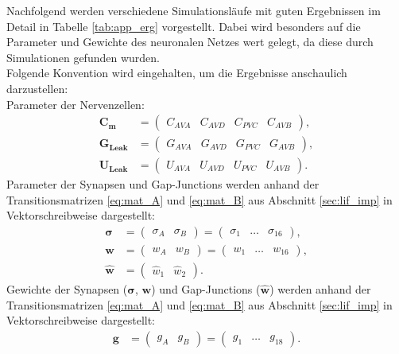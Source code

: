 	Nachfolgend werden verschiedene Simulationsläufe mit guten Ergebnissen im Detail in Tabelle \ref{tab:app_erg} vorgestellt. Dabei wird besonders auf die Parameter und Gewichte des neuronalen Netzes wert gelegt, da diese durch Simulationen gefunden wurden.\\
	Folgende Konvention wird eingehalten, um die Ergebnisse anschaulich darzustellen:\\
	Parameter der Nervenzellen:
	\begin{align}
		\boldsymbol{C_m} &= \begin{pmatrix}C_{AVA} & C_{AVD} & C_{PVC} & C_{AVB}\end{pmatrix},\\
		\boldsymbol{G_{Leak}} &= \begin{pmatrix}G_{AVA} & G_{AVD} & G_{PVC} & G_{AVB}\end{pmatrix},\\
		\boldsymbol{U_{Leak}} &= \begin{pmatrix}U_{AVA} & U_{AVD} & U_{PVC} & U_{AVB}\end{pmatrix}.
	\end{align}
	Parameter der Synapsen und Gap-Junctions  werden anhand der Transitionsmatrizen \eqref{eq:mat_A} und \eqref{eq:mat_B} aus Abschnitt \ref{sec:lif_imp} in Vektorschreibweise dargestellt:
	\begin{align}
		\boldsymbol{\sigma} &= \begin{pmatrix}\sigma_A & \sigma_B\end{pmatrix} = \begin{pmatrix}\sigma_1 & \dots & \sigma_{16}\end{pmatrix},\\
		\boldsymbol{w} &= \begin{pmatrix}w_A & w_B\end{pmatrix} = \begin{pmatrix}w_1 & \dots & w_{16}\end{pmatrix},\\
		\boldsymbol{\hat{w}} &= \begin{pmatrix}\hat{w}_1 & \hat{w}_{2}\end{pmatrix}.
	\end{align}
	Gewichte der Synapsen ($\boldsymbol{\sigma}$, $\boldsymbol{w}$) und Gap-Junctions ($\boldsymbol{\hat{w}}$) werden anhand der Transitionsmatrizen \eqref{eq:mat_A} und \ref{eq:mat_B} aus Abschnitt \ref{sec:lif_imp} in Vektorschreibweise dargestellt:
	\begin{align}
		\boldsymbol{g} &= \begin{pmatrix}g_A & g_B\end{pmatrix} = \begin{pmatrix}g_1 & \dots & g_{18}\end{pmatrix}.
	\end{align}
